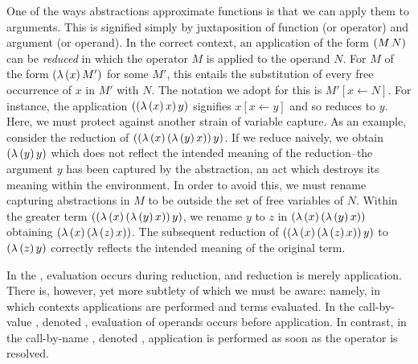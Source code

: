 One of the ways abstractions approximate functions is that we can apply them to arguments.
This is signified simply by juxtaposition of function (or operator) and argument (or
operand). In the correct context, an application of the form $(M\,N)$ can be
\emph{reduced} in which the operator $M$ is applied to the operand $N$. For $M$ of the
form $(\lambda\,(x)\,M')$ for some $M'$, this entails the substitution of every free occurrence
of $x$ in $M'$ with $N$. The notation we adopt for this is $M'[x\leftarrow N]$. For
instance, the application $((\lambda\,(x)\,x)\,y)$ signifies $x[x\leftarrow y]$ and so
reduces to $y$. Here, we must protect against another strain of variable capture. As an
example, consider the reduction of $((\lambda\,(x)\,(\lambda\,(y)\,x))\,y)$. If we reduce naively,
we obtain $(\lambda\,(y)\,y)$ which does not reflect the intended meaning of the reduction--the
argument $y$ has been captured by the abstraction, an act which destroys its meaning
within the environment. In order to avoid this, we must rename capturing abstractions in
$M$ to be outside the set of free variables of $N$. Within the greater term
$((\lambda\,(x)\,(\lambda\,(y)\,x))\,y)$, we rename $y$ to $z$ in $(\lambda\,(x)\,(\lambda\,(y)\,x))$ obtaining
$(\lambda\,(x)\,(\lambda\,(z)\,x))$. The subsequent reduction of $((\lambda\,(x)\,(\lambda\,(z)\,x))\,y)$ to
$(\lambda\,(z)\,y)$ correctly reflects the intended meaning of the original term.

In the \lc, evaluation occurs during reduction, and reduction is merely application. There
is, however, yet more subtlety of which we must be aware: namely, in which contexts
applications are performed and terms evaluated. In the call-by-value \lc, denoted \lv,
evaluation of operands occurs before application. In contrast, in the call-by-name \lc,
denoted \la, application is performed as soon as the operator is resolved.

